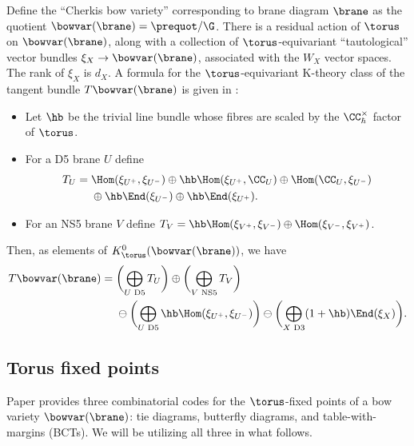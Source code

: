 Define the ``Cherkis bow variety'' corresponding to brane diagram $\brane$ as the quotient
$
\bowvar(\brane) = \prequot / \G$.
There is a residual action of $\torus$ on $\bowvar(\brane)$, along with a collection of $\torus$-equivariant ``tautological'' vector bundles $\xi_X \to \bowvar(\brane)$, associated with the $W_X$ vector spaces. The rank of $\xi_X$ is $d_X$. A formula for the $\torus$-equivariant K-theory class of the tangent bundle $T\bowvar(\brane)$ is given in \cite[Section~3.2]{RS}:
\begin{itemize}\itemsep=0pt
\item Let $\hb$ be the trivial line bundle whose fibres are scaled by the $\CC_\hbar^\times$ factor of $\torus$.
\item For a D5 brane $U$ define
\begin{align*}
T_U ={}&
\Hom(\xi_{U^+},\xi_{U^-})\oplus
\hb\Hom(\xi_{U^+},\CC_U) \oplus
\Hom(\CC_U,\xi_{U^-})
\\
& \oplus \hb \End(\xi_{U^-})\oplus \hb\End(\xi_{U^+}).
\end{align*}
\item
For an NS5 brane $V$ define
$
T_V =\hb\Hom(\xi_{V^+},\xi_{V^-}) \oplus \Hom(\xi_{V^-},\xi_{V^+})
$.
\end{itemize}
Then, as elements of $K^0_\torus (\bowvar(\brane))$, we have
\begin{align}
T\bowvar(\brane)={}&
\biggl(\bigoplus_{U \text{ D5}} T_U \biggr)\oplus
\biggl( \bigoplus_{V \text{ NS5}} T_V \biggr)\nonumber \\
&
\ominus \biggl( \bigoplus_{U \text{ D5}} \hb \Hom(\xi_{U^+},\xi_{U^-}) \biggr)
\ominus \biggl(\bigoplus_{X \text{ D3}} (1+\hb)\End(\xi_{X}) \biggr).\label{eqn:tangent_bundle}
\end{align}

\subsection{Torus fixed points} \label{sec:fixed_pts}
Paper \cite{RS} provides three combinatorial codes for the $\torus$-fixed points of a bow variety $\bowvar(\brane)$: tie diagrams, butterfly diagrams, and table-with-margins (BCTs). We will be utilizing all three in what follows.

